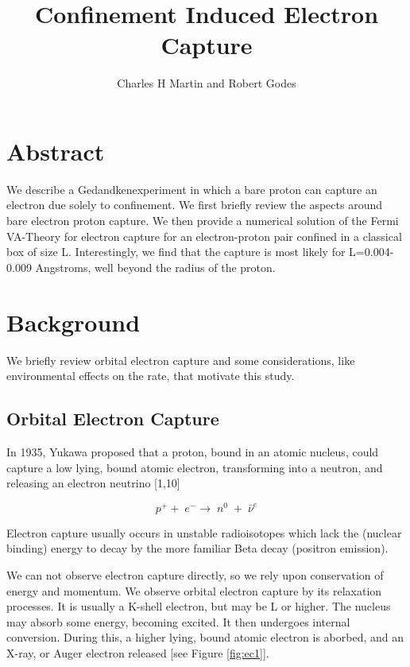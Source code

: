 \documentclass[11pt]{amsart}
\title{Confinement Induced Electron Capture}
\author{Charles H Martin and Robert Godes}
\begin{document}
\maketitle
\section{Abstract}

We describe a Gedandkenexperiment in which a bare proton can capture an electron due solely to confinement. We first briefly review the aspects around bare electron proton capture.  We then provide a numerical solution of the Fermi VA-Theory for electron capture for an electron-proton pair confined in a classical box of size L. Interestingly, we find that the capture is most likely for L=0.004-0.009 Angstroms, well beyond the radius of the proton. 

\section{Background}


We briefly review orbital electron capture and some considerations, like environmental effects on the rate, that motivate this study.

\subsection{Orbital Electron Capture}
In 1935, Yukawa proposed that a proton, bound in an atomic nucleus,  could capture a low lying, bound atomic electron, transforming into a neutron, and releasing an electron neutrino [1,10]


$$p^{+}+\;e^{-}\rightarrow\;n^{0}\;+\;\bar{\nu}^{e}$$

Electron capture usually occurs in unstable radioisotopes which lack the (nuclear binding) energy to decay by the more familiar Beta decay (positron emission).

We can not observe electron capture directly, so we rely upon conservation of energy and momentum. We observe orbital electron capture by its relaxation processes.  It is usually a K-shell electron, but may be L or higher.  The nucleus may absorb some energy, becoming excited.  It then undergoes internal conversion.  During this, a higher lying, bound atomic electron is aborbed, and an X-ray, or Auger electron released [see Figure \ref{fig:ec1}].
\end{document}
